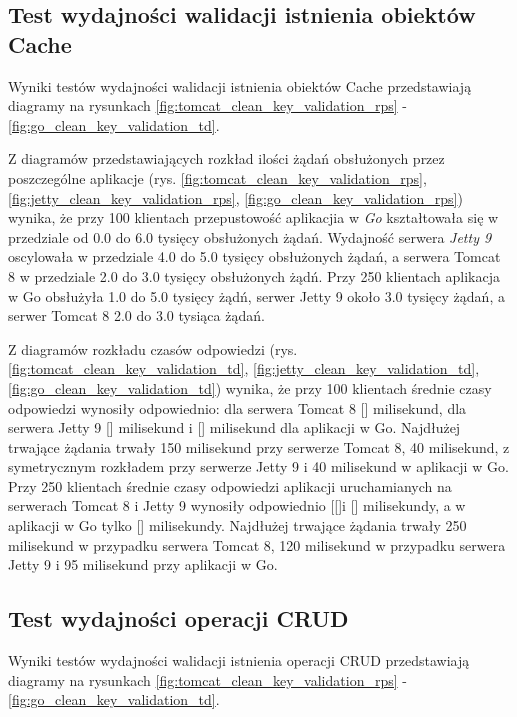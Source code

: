\subsection{Test wydajności walidacji istnienia obiektów Cache}
Wyniki testów wydajności walidacji istnienia obiektów Cache przedstawiają diagramy na rysunkach \ref{fig:tomcat_clean_key_validation_rps} - \ref{fig:go_clean_key_validation_td}.              

Z diagramów przedstawiających rozkład ilości żądań obsłużonych przez poszczególne aplikacje  (rys. \ref{fig:tomcat_clean_key_validation_rps}, \ref{fig:jetty_clean_key_validation_rps}, \ref{fig:go_clean_key_validation_rps}) wynika, że przy 100 klientach przepustowość aplikacjia w \textsl{Go} kształtowała się w przedziale od 0.0 do 6.0 tysięcy obsłużonych żądań. Wydajność serwera \textsl{Jetty 9} oscylowała w przedziale 4.0 do 5.0 tysięcy obsłużonych żądań, a  serwera Tomcat 8 w przedziale 2.0 do 3.0 tysięcy obsłużonych żądń.  Przy 250 klientach  aplikacja w Go obsłużyła 1.0 do 5.0 tysięcy żądń, serwer Jetty 9 około 3.0 tysięcy żądań, a serwer Tomcat 8  2.0 do 3.0 tysiąca żądań.

Z diagramów rozkładu czasów odpowiedzi (rys. \ref{fig:tomcat_clean_key_validation_td}, \ref{fig:jetty_clean_key_validation_td}, \ref{fig:go_clean_key_validation_td}) wynika, że przy 100 klientach średnie czasy odpowiedzi wynosiły odpowiednio: dla serwera Tomcat 8 [] milisekund, dla serwera Jetty 9 [] milisekund i [] milisekund dla aplikacji w Go.  Najdłużej trwające żądania trwały 150 milisekund przy serwerze Tomcat 8, 40 milisekund, z symetrycznym rozkładem przy serwerze  Jetty 9 i 40 milisekund  w aplikacji w Go. Przy 250 klientach średnie czasy odpowiedzi aplikacji uruchamianych na serwerach Tomcat 8 i Jetty 9  wynosiły odpowiednio [[]i [] milisekundy, a w aplikacji w Go tylko [] milisekundy. Najdłużej trwające żądania trwały 250 milisekund w przypadku serwera Tomcat 8, 120 milisekund w przypadku serwera Jetty 9 i 95 milisekund przy aplikacji w Go. 

% 
\clearpage

\subsection{Test wydajności operacji CRUD}

Wyniki testów wydajności walidacji istnienia operacji CRUD przedstawiają diagramy na rysunkach \ref{fig:tomcat_clean_key_validation_rps} - \ref{fig:go_clean_key_validation_td}.              

